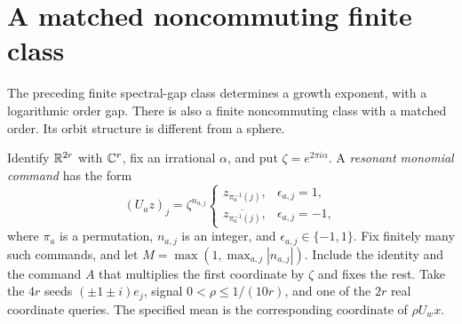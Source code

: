 \section{A matched noncommuting finite class}\label{sec:monomial}
The preceding finite spectral-gap class determines a growth exponent,
with a logarithmic order gap. There is also a finite noncommuting class
with a matched order. Its orbit structure is different from a sphere.

Identify $\mathbb R^{2r}$ with $\mathbb C^r$, fix an irrational $\alpha$, and put
$\zeta=e^{2\pi i\alpha}$. A \emph{resonant monomial command} has the form
\begin{equation}\label{eq:monomial}
 (U_a z)_j=\zeta^{n_{a,j}}
 \begin{cases}
 z_{\pi_a^{-1}(j)},&\epsilon_{a,j}=1,\\
 \overline{z_{\pi_a^{-1}(j)}},&\epsilon_{a,j}=-1,
 \end{cases}
\end{equation}
where $\pi_a$ is a permutation, $n_{a,j}$ is an integer, and
$\epsilon_{a,j}\in\{-1,1\}$. Fix finitely many such commands, and let
$M=\max(1,\max_{a,j}|n_{a,j}|)$. Include the identity and the command
$A$ that multiplies the first coordinate by $\zeta$ and fixes the rest.
Take the $4r$ seeds $(\pm1\pm i)e_j$, signal
$0<\rho\le1/(10r)$, and one of the $2r$ real coordinate queries.
The specified mean is the corresponding coordinate of $\rho U_wx$.

